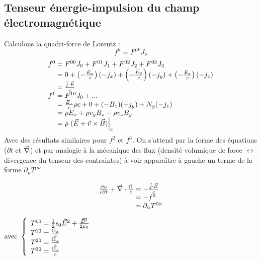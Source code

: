 \subsection{Tenseur énergie-impulsion du champ électromagnétique}
Calculons la quadri-force de Lorentz :
$$
	\boxed{f^\mu=F^{\mu\nu}J_\nu}
$$
$$
	\begin{array}{r@{\;}l}
		f^0&=F^{00}J_0+F^{01}J_1+F^{02}J_2+F^{03}J_3\\
			&=0+\left(-\frac{E_x}{c}\right)(-j_x)+\left(-\frac{E_y}{c}\right)(-j_y)+\left(-\frac{E_z}{c}\right)(-j_z)\\
			&=\frac{\vec{j}\cdot\vec{E}}{c}\\
		f^1&=F^{10}J_0+...\\
			&=\frac{E_x}{c}\rho c+0+(-B_z)(-j_y)+N_y(-j_z)\\
			&=\rho E_x +\rho v_yB_z-\rho v_zB_y\\
			&=\rho\left.(\vec{E}+\vec{v}\times\vec{B})\right|_x
	\end{array}
$$
Avec des résultats similaires pour $f^2$ et $f^3$. On s'attend par la forme des équations ($\partial t$ et $\vec{\nabla}$) et par analogie à la mécanique des flux (densité volumique de force $\leftrightarrow$ divergence du tenseur des contraintes) à voir apparaître à gauche un terme de la forme $\partial_\mu T^{\mu\nu}$

\begin{minipage}{0.45\linewidth}
$$
	\raggedleft
	\begin{array}{r@{\;}l}
		\frac{\partial u}{c\partial t}+\nab\cdot\frac{\vec{\Pi}}{c}&=-\frac{\vec{j}\cdot\vec{E}}{c}\\
			&=-f^0\\
			&=\partial_{\alpha}T^{0\alpha}
	\end{array}
$$
\end{minipage}\hspace{0.05\linewidth}
\begin{minipage}{0.40\linewidth}
$
	\text{avec }\left\{ \begin{array}{r@{\;}l}
		T^{00}&=\frac{1}{2}\epsilon_0\vec{E}^2+\frac{\vec{B}^2}{2\mu_0}\\
		T^{10}&=\frac{\Pi_x}{c}\\
		T^{20}&=\frac{\Pi_y}{c}\\
		T^{30}&=\frac{\Pi_z}{c}\\
	\end{array} \right.
$
\end{minipage}
\vspace{0.5cm}

